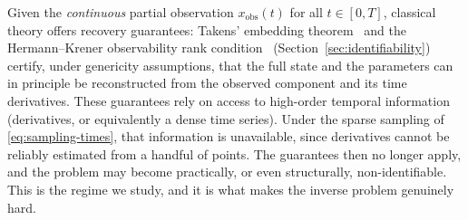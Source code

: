 \begin{remark}
Given the \emph{continuous} partial observation $x_\mathrm{obs}(t)$ for all $t\in[0,T]$, classical theory offers
recovery guarantees: Takens' embedding theorem~\cite{takens1981detecting} and the Hermann--Krener observability rank condition~\cite{hermann1977nonlinear}
(Section~\ref{sec:identifiability}) certify, under genericity assumptions, that the full state and the
parameters can in principle be reconstructed from the observed component and its time derivatives.
These guarantees rely on access to high-order temporal information (derivatives, or equivalently a dense
time series). Under the sparse sampling of \eqref{eq:sampling-times}, that information is unavailable,
since derivatives cannot be reliably estimated from a handful of points. The guarantees then no longer
apply, and the problem may become practically, or even structurally, non-identifiable. This is the
regime we study, and it is what makes the inverse problem genuinely hard.
\end{remark}